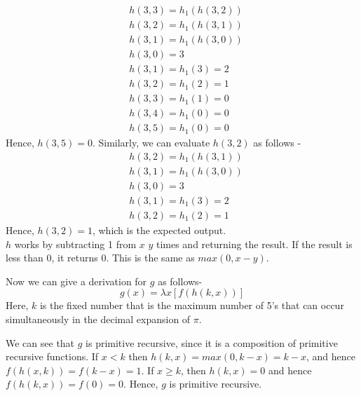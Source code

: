 \documentclass[openany]{book}
\begin{document}
\begin{exercise}
\begin{mynote}
\begin{align*}
            &h(3, 3) = h_1(h(3, 2)) \\
            &h(3, 2) = h_1(h(3, 1)) \\
            &h(3, 1) = h_1(h(3, 0)) \\
            &h(3, 0) = 3 \\
            &h(3, 1) = h_1(3) = 2   \\
            &h(3, 2) = h_1(2) = 1 \\
            &h(3, 3) = h_1(1) = 0  \\   
            &h(3, 4) = h_1(0) = 0 \\
            &h(3, 5) = h_1(0) = 0
        \end{align*}
        Hence, $h(3, 5) = 0$.
        Similarly, we can evaluate $h(3, 2)$ as follows - \\
        \begin{align*}
            &h(3, 2) = h_1(h(3, 1)) \\
            &h(3, 1) = h_1(h(3, 0)) \\
            &h(3, 0) = 3 \\
            &h(3, 1) = h_1(3) = 2 \\
            &h(3, 2) = h_1(2) = 1
        \end{align*}
        Hence, $h(3, 2) = 1$, which is the expected output. \\
        $h$ works by subtracting 1 from $x$ $y$ times and returning the result. If the result is less than 0, it returns 0. This is the same as $max(0, x-y)$.                 
    \end{mynote}    
    Now we can give a derivation for $g$ as follows-
    $$g(x) = \lambda x[f(h(k, x))]$$
    Here, $k$ is the fixed number that is the maximum number of 5's that can occur simultaneously in the decimal expansion of $\pi$.
    \begin{mynote}
        We can see that $g$ is primitive recursive, since it is a composition of primitive recursive functions. If $x < k$ then $h(k, x) = max(0, k-x) = k-x$, and hence $f(h(x, k)) = f(k-x) = 1$. If $x \geq k$, then $h(k ,x) = 0$ and hence $f(h(k, x)) = f(0) = 0$. Hence, $g$ is primitive recursive.
    \end{mynote}
\end{exercise}
\end{document}
